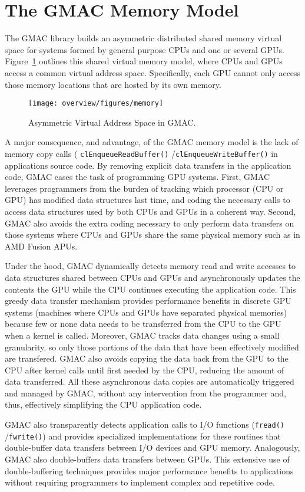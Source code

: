 \section{The GMAC Memory Model}

The GMAC library builds an asymmetric distributed shared memory virtual space for systems formed by 
general purpose CPUs and one or several GPUs. Figure~\ref{fig:overview:memory} outlines this shared 
virtual memory model, where CPUs and GPUs access a common virtual address space. Specifically, each 
GPU cannot only access those memory locations that are hosted by its own memory.

\begin{figure}
\centering
\texttt{[image: overview/figures/memory]}
\caption{Asymmetric Virtual Address Space in GMAC\@.}
\label{fig:overview:memory}
\end{figure}

A major consequence, and advantage, of the GMAC memory model is the lack of memory copy calls (\eg 
\texttt{clEnqueue\-Read\-Buffer()} \slash \texttt{clEnqueue\-Write\-Buffer()} in applications source 
code.  By removing explicit data transfers in the application code, GMAC eases the task of 
programming GPU systems. First, GMAC leverages programmers from the burden of tracking which 
processor (\ie CPU or GPU) has modified data structures last time, and coding the necessary calls to 
access data structures used by both CPUs and GPUs in a coherent way. Second, GMAC also avoids the 
extra coding necessary to only perform data transfers on those systems where CPUs and GPUs share the 
same physical memory such as in AMD Fusion APUs.

Under the hood, GMAC dynamically detects memory read and write accesses to data structures shared 
between CPUs and GPUs and asynchronously updates the contents the GPU while the CPU continues 
executing the application code. This greedy data transfer mechanism provides performance benefits in 
discrete GPU systems (\ie machines where CPUs and GPUs have separated physical memories) because few 
or none data needs to be transferred from the CPU to the GPU when a kernel is called. Moreover, GMAC 
tracks data changes using a small granularity, so only those portions of the data that have been 
effectively modified are transfered. GMAC also avoids copying the data back from the GPU to the CPU 
after kernel calls until first needed by the CPU, reducing the amount of data transferred. All these 
asynchronous data copies are automatically triggered and managed by GMAC, without any intervention 
from the programmer and, thus, effectively simplifying the CPU application code.

GMAC also transparently detects application calls to I\slash O functions (\eg \texttt{fread()} 
\slash \texttt{fwrite()}) and provides specialized implementations for these routines that 
double\hyp{}buffer data transfers between I\slash O devices and GPU memory. Analogously, GMAC also 
double\hyp{}buffers data transfers between GPUs. This extensive use of double\hyp{}buffering 
techniques provides major performance benefits to applications without requiring programmers to 
implement complex and repetitive code.

